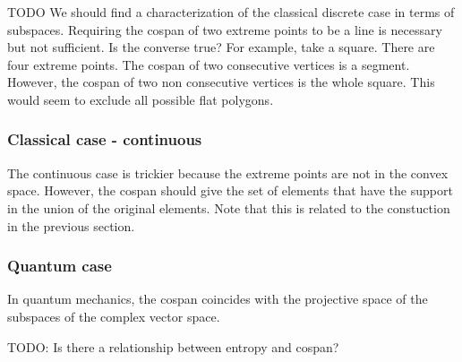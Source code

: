 \documentclass[11pt]{article}
\begin{document}
TODO We should find a characterization of the classical discrete case in terms of subspaces. Requiring the cospan of two extreme points to be a line is necessary but not sufficient. Is the converse true? For example, take a square. There are four extreme points. The cospan of two consecutive vertices is a segment. However, the cospan of two non consecutive vertices is the whole square. This would seem to exclude all possible flat polygons.

\subsubsection{Classical case - continuous}

The continuous case is trickier because the extreme points are not in the convex space. However, the cospan should give the set of elements that have the support in the union of the original elements. Note that this is related to the constuction in the previous section.

\subsubsection{Quantum case}

In quantum mechanics, the cospan coincides with the projective space of the subspaces of the complex vector space.

TODO: Is there a relationship between entropy and cospan? 
\end{document}
